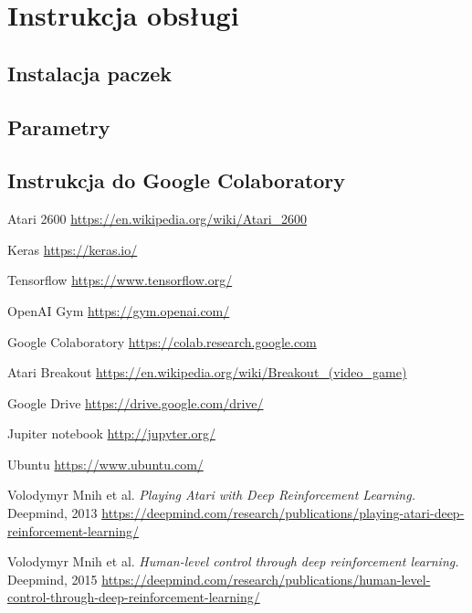 \documentclass[12pt]{article}
\begin{document}
\section{Instrukcja obsługi}
\subsection{Instalacja paczek}
\subsection{Parametry}
\subsection{Instrukcja do Google Colaboratory \cite{colab}}

\begin{thebibliography}{9}


  Atari 2600 \url{https://en.wikipedia.org/wiki/Atari_2600}

Keras \url{https://keras.io/}

Tensorflow \url{https://www.tensorflow.org/}

  OpenAI Gym \url{https://gym.openai.com/}

  Google Colaboratory \url{https://colab.research.google.com}

  Atari Breakout \url{https://en.wikipedia.org/wiki/Breakout_(video_game)}

Google Drive \url{https://drive.google.com/drive/}

Jupiter notebook \url{http://jupyter.org/}

Ubuntu \url{https://www.ubuntu.com/}

  Volodymyr Mnih et al. 
\textit{Playing Atari with Deep Reinforcement Learning.} Deepmind, 2013
   \url{https://deepmind.com/research/publications/playing-atari-deep-reinforcement-learning/}

  Volodymyr Mnih et al. 
\textit{Human-level control through deep reinforcement learning.} Deepmind, 2015
   \url{https://deepmind.com/research/publications/human-level-control-through-deep-reinforcement-learning/}


\end{thebibliography}
\end{document}
